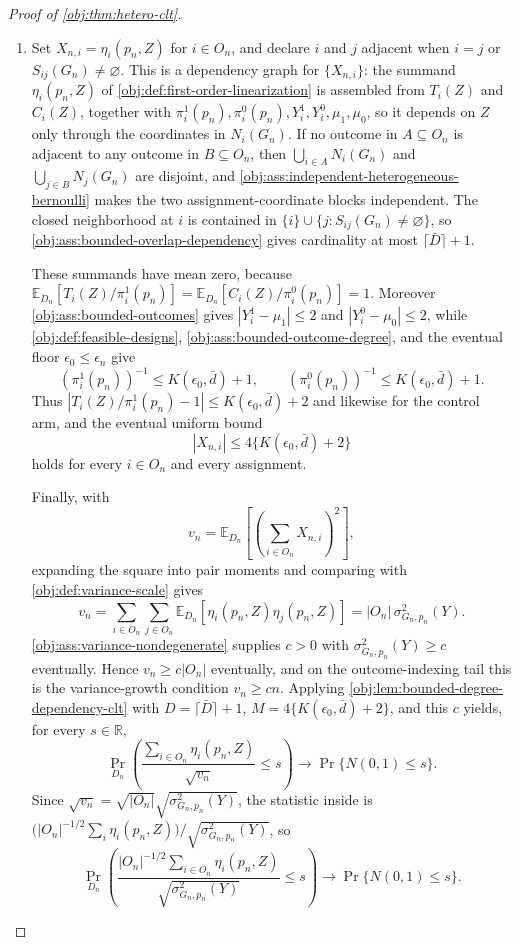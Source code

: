 \begin{proof}[Proof of \cref{obj:thm:hetero-clt}]
\begin{enumerate}
\item Set \(X_{n,i}=\eta_i(p_n,Z)\) for \(i\in O_n\), and declare \(i\) and \(j\) adjacent when \(i=j\) or \(S_{ij}(G_n)\neq\varnothing\).  This is a dependency graph for \(\{X_{n,i}\}\): the summand \(\eta_i(p_n,Z)\) of \cref{obj:def:first-order-linearization} is assembled from \(T_i(Z)\) and \(C_i(Z)\), together with \(\pi_i^1(p_n),\pi_i^0(p_n),Y_i^1,Y_i^0,\mu_1,\mu_0\), so it depends on \(Z\) only through the coordinates in \(N_i(G_n)\).  If no outcome in \(A\subseteq O_n\) is adjacent to any outcome in \(B\subseteq O_n\), then \(\bigcup_{i\in A}N_i(G_n)\) and \(\bigcup_{j\in B}N_j(G_n)\) are disjoint, and \cref{obj:ass:independent-heterogeneous-bernoulli} makes the two assignment-coordinate blocks independent.  The closed neighborhood at \(i\) is contained in \(\{i\}\cup\{j:S_{ij}(G_n)\neq\varnothing\}\), so \cref{obj:ass:bounded-overlap-dependency} gives cardinality at most \(\lceil\bar D\rceil+1\).

These summands have mean zero, because \(\mathbb E_{D_n}[T_i(Z)/\pi_i^1(p_n)]=\mathbb E_{D_n}[C_i(Z)/\pi_i^0(p_n)]=1\).
Moreover \cref{obj:ass:bounded-outcomes} gives \(|Y_i^1-\mu_1|\le2\) and \(|Y_i^0-\mu_0|\le2\), while \cref{obj:def:feasible-designs}, \cref{obj:ass:bounded-outcome-degree}, and the eventual floor \(\epsilon_0\le\epsilon_n\) give
\[
\left(\pi_i^1(p_n)\right)^{-1}\le K(\epsilon_0,\bar d)+1,
\qquad
\left(\pi_i^0(p_n)\right)^{-1}\le K(\epsilon_0,\bar d)+1 .
\]
Thus \(|T_i(Z)/\pi_i^1(p_n)-1|\le K(\epsilon_0,\bar d)+2\) and likewise for the control arm, and the eventual uniform bound
\[
|X_{n,i}|\le 4\{K(\epsilon_0,\bar d)+2\}
\]
holds for every \(i\in O_n\) and every assignment.

Finally, with
\[
v_n=\mathbb E_{D_n}\!\left[\left(\sum_{i\in O_n}X_{n,i}\right)^2\right],
\]
expanding the square into pair moments and comparing with \cref{obj:def:variance-scale} gives
\[
v_n=
\sum_{i\in O_n}\sum_{j\in O_n}
\mathbb E_{D_n}\!\left[\eta_i(p_n,Z)\eta_j(p_n,Z)\right]
=|O_n|\,\sigma^2_{G_n,p_n}(Y).
\]
\cref{obj:ass:variance-nondegenerate} supplies \(c>0\) with \(\sigma^2_{G_n,p_n}(Y)\ge c\) eventually.  Hence \(v_n\ge c|O_n|\) eventually, and on the outcome-indexing tail this is the variance-growth condition \(v_n\ge cn\).  Applying \cref{obj:lem:bounded-degree-dependency-clt} with \(D=\lceil\bar D\rceil+1\), \(M=4\{K(\epsilon_0,\bar d)+2\}\), and this \(c\) yields, for every \(s\in\mathbb R\),
\[
\Pr_{D_n}\!\left(\frac{\sum_{i\in O_n}\eta_i(p_n,Z)}{\sqrt{v_n}}\le s\right)
\longrightarrow
\Pr\{N(0,1)\le s\}.
\]
Since \(\sqrt{v_n}=\sqrt{|O_n|}\sqrt{\sigma^2_{G_n,p_n}(Y)}\), the statistic inside is
\(\bigl(|O_n|^{-1/2}\sum_i\eta_i(p_n,Z)\bigr)\big/\sqrt{\sigma^2_{G_n,p_n}(Y)}\), so
\[
\Pr_{D_n}\!\left(
\frac{|O_n|^{-1/2}\sum_{i\in O_n}\eta_i(p_n,Z)}
{\sqrt{\sigma^2_{G_n,p_n}(Y)}}\le s
\right)
\longrightarrow
\Pr\{N(0,1)\le s\}.
\]


\end{enumerate}
\end{proof}
